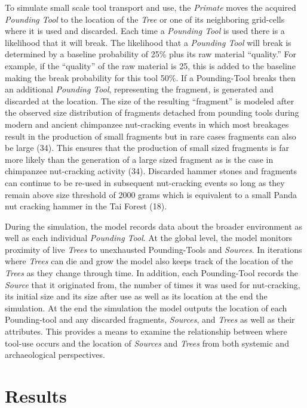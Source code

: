 \documentclass[9pt,twocolumn,twoside,]{pnas-new}
\begin{document}
To simulate small scale tool transport and use, the \emph{Primate} moves
the acquired \emph{Pounding Tool} to the location of the \emph{Tree} or
one of its neighboring grid-cells where it is used and discarded. Each
time a \emph{Pounding Tool} is used there is a likelihood that it will
break. The likelihood that a \emph{Pounding Tool} will break is
determined by a baseline probability of 25\% plus its raw material
``quality.'' For example, if the ``quality'' of the raw material is 25,
this is added to the baseline making the break probability for this tool
50\%. If a Pounding-Tool breaks then an additional \emph{Pounding Tool},
representing the fragment, is generated and discarded at the location.
The size of the resulting ``fragment'' is modeled after the observed
size distribution of fragments detached from pounding tools during
modern and ancient chimpanzee nut-cracking events in which most
breakages result in the production of small fragments but in rare cases
fragments can also be large (34). This ensures that the production of
small sized fragments is far more likely than the generation of a large
sized fragment as is the case in chimpanzee nut-cracking activity (34).
Discarded hammer stones and fragments can continue to be re-used in
subsequent nut-cracking events so long as they remain above size
threshold of 2000 grams which is equivalent to a small Panda nut
cracking hammer in the Tai Forest (18).

During the simulation, the model records data about the broader
environment as well as each individual \emph{Pounding Tool}. At the
global level, the model monitors proximity of live \emph{Trees} to
unexhausted Pounding-Tools and \emph{Sources}. In iterations where
\emph{Trees} can die and grow the model also keeps track of the location
of the \emph{Trees} as they change through time. In addition, each
Pounding-Tool records the \emph{Source} that it originated from, the
number of times it was used for nut-cracking, its initial size and its
size after use as well as its location at the end the simulation. At the
end the simulation the model outputs the location of each Pounding-tool
and any discarded fragments, \emph{Sources}, and \emph{Trees} as well as
their attributes. This provides a means to examine the relationship
between where tool-use occurs and the location of \emph{Sources} and
\emph{Trees} from both systemic and archaeological perspectives.

\hypertarget{results}{%
\section{Results}\label{results}}
\end{document}
